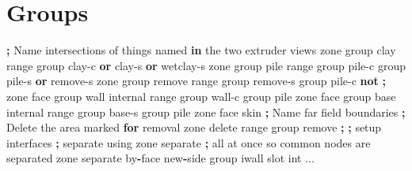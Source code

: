 \documentclass[a4paper, nobind]{templates/ociamthesis}
\newenvironment{Shaded}{\begin{snugshade}}{\end{snugshade}}
\newcommand{\BuiltInTok}[1]{#1}
\newcommand{\ControlFlowTok}[1]{\textcolor[rgb]{0.13,0.29,0.53}{\textbf{#1}}}
\newcommand{\KeywordTok}[1]{\textcolor[rgb]{0.13,0.29,0.53}{\textbf{#1}}}
\newcommand{\NormalTok}[1]{#1}
\newcommand{\OperatorTok}[1]{\textcolor[rgb]{0.81,0.36,0.00}{\textbf{#1}}}
\newcommand{\StringTok}[1]{\textcolor[rgb]{0.31,0.60,0.02}{#1}}
\renewenvironment{Shaded}
{
  \vspace{10pt}%
  \begin{snugshade}%
}{%
  \end{snugshade}%
  \vspace{8pt}%
}
\begin{document}
\hypertarget{groups-1}{%
\section{Groups}\label{groups-1}}

\begin{Shaded}
\begin{Highlighting}[]
\OperatorTok{;}\NormalTok{ Name intersections of things named }\KeywordTok{in}\NormalTok{ the two extruder views}
\NormalTok{zone group }\StringTok{\textquotesingle{}clay\textquotesingle{}} \BuiltInTok{range}\NormalTok{ group }\StringTok{\textquotesingle{}clay{-}c\textquotesingle{}} \KeywordTok{or} \StringTok{\textquotesingle{}clay{-}s\textquotesingle{}} \KeywordTok{or} \StringTok{\textquotesingle{}wetclay{-}s\textquotesingle{}}
\NormalTok{zone group }\StringTok{\textquotesingle{}pile\textquotesingle{}} \BuiltInTok{range}\NormalTok{ group }\StringTok{\textquotesingle{}pile{-}c\textquotesingle{}}\NormalTok{ group }\StringTok{\textquotesingle{}pile{-}s\textquotesingle{}} \KeywordTok{or} \StringTok{\textquotesingle{}remove{-}s\textquotesingle{}}
\NormalTok{zone group }\StringTok{\textquotesingle{}remove\textquotesingle{}} \BuiltInTok{range}\NormalTok{ group }\StringTok{\textquotesingle{}remove{-}s\textquotesingle{}}\NormalTok{ group }\StringTok{\textquotesingle{}pile{-}c\textquotesingle{}} \KeywordTok{not} \OperatorTok{;} 
\NormalTok{zone face group }\StringTok{\textquotesingle{}wall\textquotesingle{}}\NormalTok{ internal }\BuiltInTok{range}\NormalTok{ group }\StringTok{\textquotesingle{}wall{-}c\textquotesingle{}}\NormalTok{ group }\StringTok{\textquotesingle{}pile\textquotesingle{}}
\NormalTok{zone face group }\StringTok{\textquotesingle{}base\textquotesingle{}}\NormalTok{ internal }\BuiltInTok{range}\NormalTok{ group }\StringTok{\textquotesingle{}base{-}s\textquotesingle{}}\NormalTok{ group }\StringTok{\textquotesingle{}pile\textquotesingle{}}
\NormalTok{zone face skin }\OperatorTok{;}\NormalTok{ Name far field boundaries}
\OperatorTok{;}\NormalTok{ Delete the area marked }\ControlFlowTok{for}\NormalTok{ removal}
\NormalTok{zone delete }\BuiltInTok{range}\NormalTok{ group }\StringTok{\textquotesingle{}remove\textquotesingle{}}
\OperatorTok{;}
\OperatorTok{;}\NormalTok{ setup interfaces}
\OperatorTok{;}\NormalTok{ separate using zone separate}
\OperatorTok{;} \BuiltInTok{all}\NormalTok{ at once so common nodes are separated}
\NormalTok{zone separate by}\OperatorTok{{-}}\NormalTok{face new}\OperatorTok{{-}}\NormalTok{side group }\StringTok{\textquotesingle{}iwall\textquotesingle{}}\NormalTok{ slot }\StringTok{\textquotesingle{}int\textquotesingle{}}\NormalTok{ ...}

\end{Highlighting}
\end{Shaded}
\end{document}
